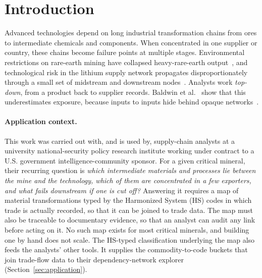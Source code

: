 \section{Introduction}
\label{sec:introduction}

Advanced technologies depend on long industrial transformation chains from ores to intermediate chemicals and components. When concentrated in one supplier or country, these chains become failure points at multiple stages. Environmental restrictions on rare-earth mining have collapsed heavy-rare-earth output~\cite{zhang2024reshaping}, and technological risk in the lithium supply network propagates disproportionately through a small set of midstream and downstream nodes~\cite{hu2025technological}. Analysts work \emph{top-down}, from a product back to supplier records. Baldwin et al.~\cite{baldwin2023hidden} show that this underestimates exposure, because inputs to inputs hide behind opaque networks~\cite{colon2022systemic}.

\paragraph{Application context.}
This work was carried out with, and is used by, supply-chain analysts at a university national-security policy research institute working under contract to a U.S. government intelligence-community sponsor. For a given critical mineral, their recurring question is \emph{which intermediate materials and processes lie between the mine and the technology, which of them are concentrated in a few exporters, and what fails downstream if one is cut off?} Answering it requires a map of material transformations typed by the Harmonized System (HS) codes in which trade is actually recorded, so that it can be joined to trade data. The map must also be traceable to documentary evidence, so that an analyst can audit any link before acting on it. No such map exists for most critical minerals, and building one by hand does not scale. The HS-typed classification underlying the map also feeds the analysts' other tools. It supplies the commodity-to-code buckets that join trade-flow data to their dependency-network explorer (Section~\ref{sec:application}).

